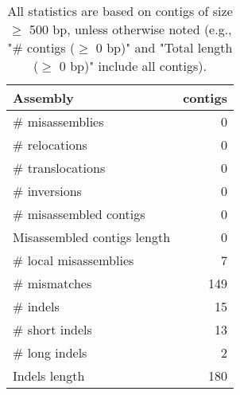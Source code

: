 \documentclass[12pt,a4paper]{article}
\begin{document}
\begin{table}[ht]
\begin{center}
\caption{All statistics are based on contigs of size $\geq$ 500 bp, unless otherwise noted (e.g., "\# contigs ($\geq$ 0 bp)" and "Total length ($\geq$ 0 bp)" include all contigs).}
\begin{tabular}{|l*{1}{|r}|}
\hline
Assembly & contigs \\ \hline
\# misassemblies & 0 \\ \hline
\hspace{5mm}\# relocations & 0 \\ \hline
\hspace{5mm}\# translocations & 0 \\ \hline
\hspace{5mm}\# inversions & 0 \\ \hline
\# misassembled contigs & 0 \\ \hline
Misassembled contigs length & 0 \\ \hline
\# local misassemblies & 7 \\ \hline
\# mismatches & 149 \\ \hline
\# indels & 15 \\ \hline
\hspace{5mm}\# short indels & 13 \\ \hline
\hspace{5mm}\# long indels & 2 \\ \hline
Indels length & 180 \\ \hline
\end{tabular}
\end{center}
\end{table}
\end{document}
